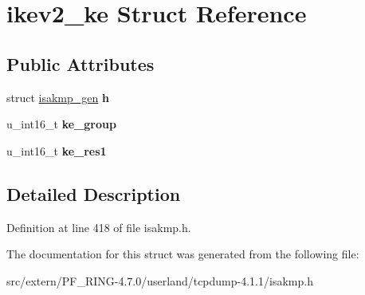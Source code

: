 \hypertarget{structikev2__ke}{
\section{ikev2\_\-ke Struct Reference}
\label{structikev2__ke}
}
\subsection*{Public Attributes}
\begin{DoxyCompactItemize}
\item 
\hypertarget{structikev2__ke_ae57edafd490b34b7d57eb485df7de507}{
struct \hyperlink{structisakmp__gen}{isakmp\_\-gen} {\bfseries h}}
\label{structikev2__ke_ae57edafd490b34b7d57eb485df7de507}

\item 
\hypertarget{structikev2__ke_acaf5ed2b3e0cb925825eb7566a83b9fd}{
u\_\-int16\_\-t {\bfseries ke\_\-group}}
\label{structikev2__ke_acaf5ed2b3e0cb925825eb7566a83b9fd}

\item 
\hypertarget{structikev2__ke_a11ed9471674053827cc81e763970ec43}{
u\_\-int16\_\-t {\bfseries ke\_\-res1}}
\label{structikev2__ke_a11ed9471674053827cc81e763970ec43}

\end{DoxyCompactItemize}


\subsection{Detailed Description}


Definition at line 418 of file isakmp.h.



The documentation for this struct was generated from the following file:\begin{DoxyCompactItemize}
\item 
src/extern/PF\_\-RING-\/4.7.0/userland/tcpdump-\/4.1.1/isakmp.h\end{DoxyCompactItemize}
